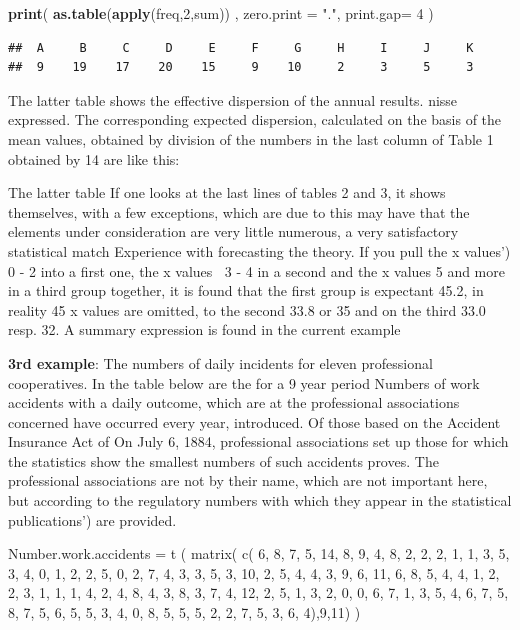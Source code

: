 \documentclass[]{book}
\newenvironment{Shaded}{\begin{snugshade}}{\end{snugshade}}
\newcommand{\DataTypeTok}[1]{\textcolor[rgb]{0.13,0.29,0.53}{#1}}
\newcommand{\DecValTok}[1]{\textcolor[rgb]{0.00,0.00,0.81}{#1}}
\newcommand{\KeywordTok}[1]{\textcolor[rgb]{0.13,0.29,0.53}{\textbf{#1}}}
\newcommand{\NormalTok}[1]{#1}
\newcommand{\StringTok}[1]{\textcolor[rgb]{0.31,0.60,0.02}{#1}}
\begin{document}
\begin{Shaded}
\begin{Highlighting}[]
\KeywordTok{print}\NormalTok{( }\KeywordTok{as.table}\NormalTok{(}\KeywordTok{apply}\NormalTok{(freq,}\DecValTok{2}\NormalTok{,sum)) ,}
       \DataTypeTok{zero.print =} \StringTok{"."}\NormalTok{, }\DataTypeTok{print.gap=} \DecValTok{4}\NormalTok{ )}
\end{Highlighting}
\end{Shaded}

\begin{verbatim}
##  A     B     C     D     E     F     G     H     I     J     K    
##  9    19    17    20    15     9    10     2     3     5     3
\end{verbatim}

The latter table shows the effective dispersion of the annual results.
nisse expressed. The corresponding expected dispersion, calculated on the basis of the mean values, obtained by division
of the numbers in the last column of Table 1 obtained by 14
are like this:

The latter table If one looks at the last lines of tables 2 and 3, it shows
themselves, with a few exceptions, which are due to this
may have that the elements under consideration are very little
numerous, a very satisfactory statistical match
Experience with forecasting the theory.
If you pull the x values') 0 - 2 into a first one, the x values 3 - 4
in a second and the x values 5 and more in a third group
together, it is found that the first group is expectant
45.2, in reality 45 x values are omitted, to the second 33.8 or 35
and on the third 33.0 resp. 32.
A summary expression is found in the current example

\textbf{3rd example}: The numbers of daily incidents for eleven professional
cooperatives.
In the table below are the for a 9 year period
Numbers of work accidents with a daily outcome, which are at
the professional associations concerned have occurred every year,
introduced. Of those based on the Accident Insurance Act of
On July 6, 1884, professional associations set up those
for which the statistics show the smallest numbers of such accidents
proves. The professional associations are not by their name,
which are not important here, but according to the regulatory
numbers with which they appear in the statistical publications')
are provided.

Number.work.accidents = t ( matrix( c(
6, 8, 7, 5, 14, 8, 9, 4, 8,
2, 2, 2, 1, 1, 3, 5, 3, 4,
0, 1, 2, 2, 5, 0, 2, 7, 4,
3, 3, 5, 3, 10, 2, 5, 4, 4,
3, 9, 6, 11, 6, 8, 5, 4, 4,
1, 2, 2, 3, 1, 1, 1, 4, 2,
4, 8, 4, 3, 8, 3, 7, 4, 12,
2, 5, 1, 3, 2, 0, 0, 6, 7,
1, 3, 5, 4, 6, 7, 5, 8, 7,
5, 6, 5, 5, 3, 4, 0, 8, 5,
5, 5, 2, 2, 7, 5, 3, 6, 4),9,11) )
\end{document}
